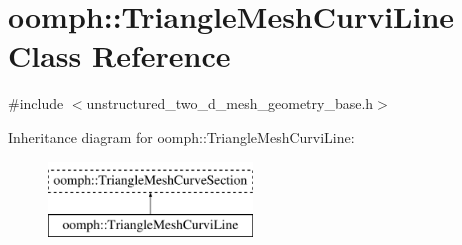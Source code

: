 \hypertarget{classoomph_1_1TriangleMeshCurviLine}{}\section{oomph\+:\+:Triangle\+Mesh\+Curvi\+Line Class Reference}
\label{classoomph_1_1TriangleMeshCurviLine}


{\ttfamily \#include $<$unstructured\+\_\+two\+\_\+d\+\_\+mesh\+\_\+geometry\+\_\+base.\+h$>$}

Inheritance diagram for oomph\+:\+:Triangle\+Mesh\+Curvi\+Line\+:\begin{figure}[H]
\begin{center}
\leavevmode
\includegraphics[height=2.000000cm]{classoomph_1_1TriangleMeshCurviLine}
\end{center}
\end{figure}
